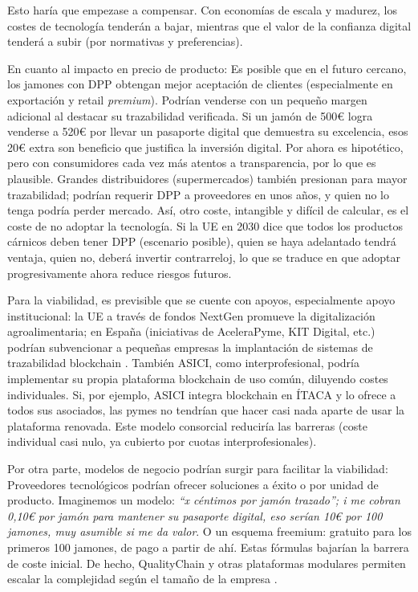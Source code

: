 Esto haría que empezase a compensar. Con economías de escala y madurez, los costes de tecnología tenderán a bajar, mientras que el valor de la confianza digital tenderá a subir (por normativas y preferencias).

En cuanto al impacto en precio de producto: Es posible que en el futuro cercano, los jamones con DPP obtengan mejor aceptación de clientes (especialmente en exportación y retail \textit{premium}). Podrían venderse con un pequeño margen adicional al destacar su trazabilidad verificada. Si un jamón de 500€ logra venderse a 520€ por llevar un pasaporte digital que demuestra su excelencia, esos 20€ extra son beneficio que justifica la inversión digital. Por ahora es hipotético, pero con consumidores cada vez más atentos a transparencia, por lo que es plausible. Grandes distribuidores (supermercados) también presionan para mayor trazabilidad; podrían requerir DPP a proveedores en unos años, y quien no lo tenga podría perder mercado. Así, otro coste, intangible y difícil de calcular, es el coste de no adoptar la tecnología. Si la UE en 2030 dice que todos los productos cárnicos deben tener DPP (escenario posible), quien se haya adelantado tendrá ventaja, quien no, deberá invertir contrarreloj, lo que se traduce en que adoptar progresivamente ahora reduce riesgos futuros.

Para la viabilidad, es previsible que se cuente con apoyos, especialmente apoyo institucional: la UE a través de fondos NextGen promueve la digitalización agroalimentaria; en España (iniciativas de AceleraPyme, KIT Digital, etc.) podrían subvencionar a pequeñas empresas la implantación de sistemas de trazabilidad blockchain \cite{acelerapyme_mejora_2023}. También ASICI, como interprofesional, podría implementar su propia plataforma blockchain de uso común, diluyendo costes individuales. Si, por ejemplo, ASICI integra blockchain en ÍTACA y lo ofrece a todos sus asociados, las pymes no tendrían que hacer casi nada aparte de usar la plataforma renovada. Este modelo consorcial reduciría las barreras (coste individual casi nulo, ya cubierto por cuotas interprofesionales).

Por otra parte, modelos de negocio podrían surgir para facilitar la viabilidad: Proveedores tecnológicos podrían ofrecer soluciones a éxito o por unidad de producto. Imaginemos un modelo: \textit{“x céntimos por jamón trazado”; i me cobran 0,10€ por jamón para mantener su pasaporte digital, eso serían 10€ por 100 jamones, muy asumible si me da valor}. O un esquema freemium: gratuito para los primeros 100 jamones, de pago a partir de ahí. Estas fórmulas bajarían la barrera de coste inicial.
De hecho, QualityChain y otras plataformas modulares permiten escalar la complejidad según el tamaño de la empresa \cite{salaris_trazabilidad_2020}.

